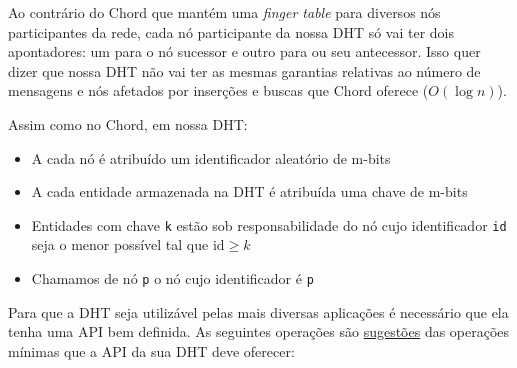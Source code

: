 \documentclass[oneside,12pt,a4paper]{article}
\begin{document}
Ao contrário do Chord que mantém uma \emph{finger table} para
diversos nós participantes da rede, cada nó participante da nossa DHT
só vai ter dois apontadores: um para o nó sucessor e outro para ou seu
antecessor. Isso quer dizer que nossa DHT não vai ter as mesmas
garantias relativas ao número de mensagens e nós afetados por
inserções e buscas que Chord oferece ($O(\log{}n)$).

Assim como no Chord, em nossa DHT:

\begin{itemize}
\item A cada nó é atribuído um identificador aleatório de m-bits
\item A cada entidade armazenada na DHT é atribuída uma chave de m-bits
\item Entidades com chave \texttt{k} estão sob responsabilidade do nó
  cujo identificador \texttt{id} seja o menor possível tal que
  $\text{id} \geq k$
\item Chamamos de nó \texttt{p} o nó cujo identificador é \texttt{p}
\end{itemize}

Para que a DHT seja utilizável pelas mais diversas aplicações é
necessário que ela tenha uma API bem definida. As seguintes operações
são \underline{sugestões} das operações mínimas que a API da sua DHT
deve oferecer:
\end{document}
